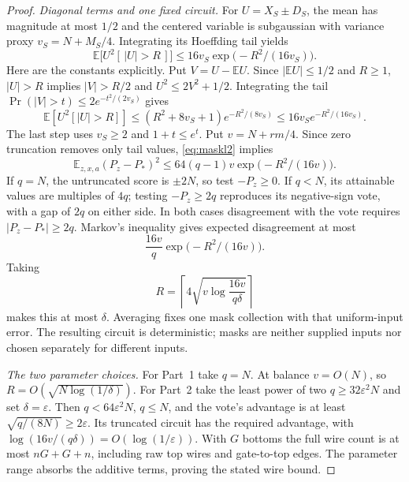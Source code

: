 \documentclass[11pt]{article}
\newcommand{\ind}[1]{[\,#1\,]}
\begin{document}
\begin{proof}
\emph{Diagonal terms and one fixed circuit.}
For $U=X_S\pm D_S$, the mean has magnitude at most $1/2$ and the centered
variable is subgaussian with variance proxy $v_S=N+M_S/4$. Integrating its
Hoeffding tail yields
$$
\mathbb E\bigl[U^2\ind{|U|>R}\bigr]
 \le16v_S\exp\bigl(-R^2/(16v_S)\bigr).
$$
Here are the constants explicitly. Put $V=U-\mathbb EU$. Since
$|\mathbb EU|\le1/2$ and $R\ge1$, $|U|>R$ implies $|V|>R/2$ and
$U^2\le2V^2+1/2$. Integrating the tail
$\Pr(|V|>t)\le2e^{-t^2/(2v_S)}$ gives
$$\mathbb E[U^2[|U|>R]]\le(R^2+8v_S+1)e^{-R^2/(8v_S)}
 \le16v_Se^{-R^2/(16v_S)}.$$
The last step uses $v_S\ge2$ and $1+t\le e^t$. Put $v=N+rm/4$. Since zero truncation removes only tail values,
\eqref{eq:maskl2} implies
$$
\mathbb E_{z,x,a}(P_z-P_*)^2
 \le64(q-1)v\exp\bigl(-R^2/(16v)\bigr).
$$
If $q=N$, the untruncated score is $\pm2N$, so test $-P_z\ge0$.
If $q<N$, its attainable values are multiples of $4q$; testing
$-P_z\ge2q$ reproduces its negative-sign vote, with a gap of $2q$ on
either side. In both cases disagreement with the vote requires
$|P_z-P_*|\ge2q$. Markov's inequality gives expected disagreement at most
$$
\frac{16v}{q}\exp\bigl(-R^2/(16v)\bigr).
$$
Taking
$$
R=\left\lceil4\sqrt{v\log\frac{16v}{q\delta}}\right\rceil
$$
makes this at most $\delta$. Averaging fixes one mask collection with that
uniform-input error. The resulting circuit is deterministic; masks are
neither supplied inputs nor chosen separately for different inputs.

\emph{The two parameter choices.}
For Part~1 take $q=N$. At balance $v=O(N)$, so
$R=O(\sqrt{N\log(1/\delta)})$. For Part~2 take the least power of two
$q\ge32\varepsilon^2N$ and set $\delta=\varepsilon$.
Then $q<64\varepsilon^2N$, $q\le N$, and the vote's advantage is at least
$\sqrt{q/(8N)}\ge2\varepsilon$. Its truncated circuit has the required
advantage, with $\log(16v/(q\delta))=O(\log(1/\varepsilon))$.
With $G$ bottoms the full wire count is at most $nG+G+n$, including
raw top wires and gate-to-top edges. The parameter range absorbs the
additive terms, proving the stated wire bound.
\end{proof}
\end{document}
